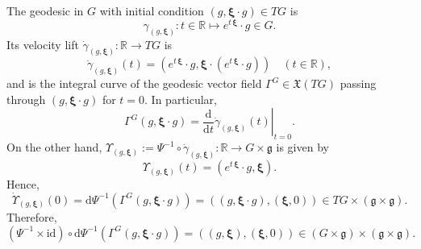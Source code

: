 \documentclass[12pt,a4paper]{article}
\theoremstyle{plain}
\theoremstyle{definition}
\begin{document}
The geodesic in $G$ 
with initial condition $(g,\boldsymbol{\xi}\cdot g)\in TG$
is 
$$\gamma_{(g,\boldsymbol{\xi})}:t\in \mathbb{R}\mapsto 
e^{t\,\boldsymbol{\xi}}\cdot g\in G.
$$ 
Its velocity lift 
$\dot{\gamma}_{(g,\boldsymbol{\xi})}:\mathbb{R}\rightarrow TG$ 
is 
%
$$
\dot{\gamma}_{(g,\boldsymbol{\xi})}(t)=
\left(e^{t\,\boldsymbol{\xi}}\cdot g, \boldsymbol{\xi}\cdot 
\left( e^{t\,\boldsymbol{\xi}}\cdot g \right)   \right)\quad 
(t\in \mathbb{R}),
$$
and is the integral curve of the geodesic vector field 
$\Gamma^G\in \mathfrak{X}(TG)$ passing through 
$(g,\boldsymbol{\xi}\cdot g)$ for $t=0$. In particular,
$$
\Gamma^G(g,\boldsymbol{\xi}\cdot g)=
\left.\frac{\mathrm{d}}{\mathrm{d}t}
\dot{\gamma}_{(g,\boldsymbol{\xi})}(t)\right|_{t=0}.
$$
%
On the other hand, 
$\Upsilon_{(g,\boldsymbol{\xi})}:=\Psi^{-1}\circ \dot{\gamma}_{(g,\boldsymbol{\xi})}:
\mathbb{R}\rightarrow G\times \mathfrak{g}$ is given by
$$
\Upsilon_{(g,\boldsymbol{\xi})}(t)
=\left(e^{t\,\boldsymbol{\xi}}\cdot g, \boldsymbol{\xi}  \right).
$$
Hence, 
$$
\dot{\Upsilon}_{(g,\boldsymbol{\xi})}(0)=
\mathrm{d}\Psi^{-1}\left(\Gamma^G(g,\boldsymbol{\xi}\cdot g)\right)
=
\left(\left( g,
\boldsymbol{\xi}\cdot  g\right), (\boldsymbol{\xi},0)\right)
\in TG\times (\mathfrak{g}\times \mathfrak{g}).
$$
Therefore, 
\begin{equation}
\label{eqn:geod vf}
(\Psi^{-1}\times \mathrm{id})\circ 
\mathrm{d}\Psi^{-1}\left(\Gamma^G(g,\boldsymbol{\xi}\cdot g)\right)
=\left( (g,
\boldsymbol{\xi}), (\boldsymbol{\xi},0)\right)
\in (G\times \mathfrak{g})
\times (\mathfrak{g}\times \mathfrak{g}).
\end{equation}
\end{document}
